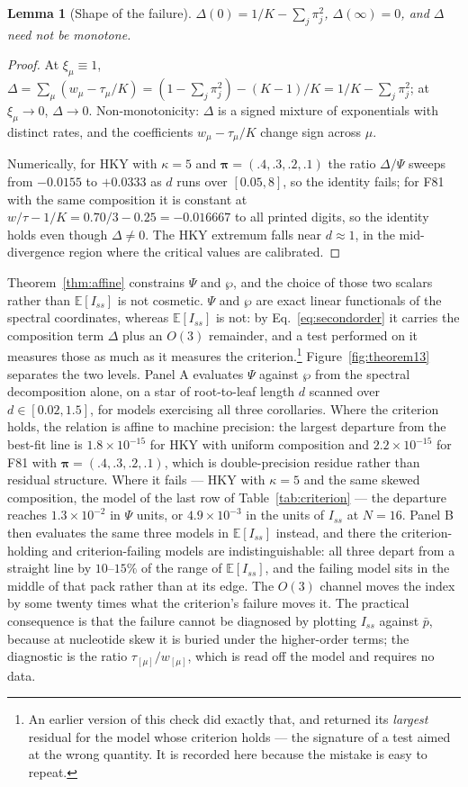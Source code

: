 \documentclass[preprint,12pt,authoryear]{elsarticle}
\newcommand{\Iss}{I_{ss}}
\newcommand{\bpi}{\boldsymbol{\pi}}
\newcommand{\E}{\mathbb{E}}
\newtheorem{lemma}[theorem]{Lemma}
\theoremstyle{definition}
\theoremstyle{remark}
\begin{document}
\begin{lemma}[Shape of the failure]
\label{lem:delta}
$\Delta(0)=1/K-\sum_j\pi_j^2$, $\Delta(\infty)=0$, and $\Delta$ need not be
monotone.
\end{lemma}

\begin{proof}
At $\xi_\mu\equiv1$, $\Delta=\sum_\mu(w_\mu-\tau_\mu/K)=(1-\sum_j\pi_j^2)-(K-1)/K=1/K-\sum_j\pi_j^2$;
at $\xi_\mu\to0$, $\Delta\to0$. Non-monotonicity: $\Delta$ is a signed mixture
of exponentials with distinct rates, and the coefficients
$w_\mu-\tau_\mu/K$ change sign across $\mu$.

Numerically, for HKY with $\kappa=5$ and $\bpi=(.4,.3,.2,.1)$ the ratio
$\Delta/\Psi$ sweeps from $-0.0155$ to $+0.0333$ as $d$ runs over
$[0.05,8]$, so the identity fails; for F81 with the same composition it is
constant at $w/\tau-1/K=0.70/3-0.25=-0.016667$ to all printed digits, so the
identity holds even though $\Delta\ne0$. The HKY extremum falls near
$d\approx1$, in the mid-divergence region where the critical values are
calibrated.
\end{proof}

Theorem~\ref{thm:affine} constrains $\Psi$ and $\wp$, and the choice of those
two scalars rather than $\E[\Iss]$ is not cosmetic. $\Psi$ and $\wp$ are exact
linear functionals of the spectral coordinates, whereas $\E[\Iss]$ is not: by
Eq.~\eqref{eq:secondorder} it carries the composition term $\Delta$ plus an
$O(3)$ remainder, and a test performed on it measures those as much as it
measures the criterion.\footnote{An earlier version of this check did exactly
that, and returned its \emph{largest} residual for the model whose criterion
holds --- the signature of a test aimed at the wrong quantity. It is recorded
here because the mistake is easy to repeat.} Figure~\ref{fig:theorem13}
separates the two levels. Panel A evaluates $\Psi$ against $\wp$ from the
spectral decomposition alone, on a star of root-to-leaf length $d$ scanned
over $d\in[0.02,1.5]$, for models exercising all three corollaries. Where the
criterion holds, the relation is affine to machine precision: the largest
departure from the best-fit line is $1.8\times10^{-15}$ for HKY with uniform
composition and $2.2\times10^{-15}$ for F81 with $\bpi=(.4,.3,.2,.1)$, which
is double-precision residue rather than residual structure. Where it fails ---
HKY with $\kappa=5$ and the same skewed composition, the model of the last row
of Table~\ref{tab:criterion} --- the departure reaches $1.3\times10^{-2}$ in
$\Psi$ units, or $4.9\times10^{-3}$ in the units of $\Iss$ at $N=16$.
Panel B then evaluates the same three models in $\E[\Iss]$ instead, and there
the criterion-holding and criterion-failing models are indistinguishable: all
three depart from a straight line by $10$--$15\%$ of the range of $\E[\Iss]$,
and the failing model sits in the middle of that pack rather than at its edge.
The $O(3)$ channel moves the index by some twenty times what the criterion's
failure moves it. The practical consequence is that the failure cannot be
diagnosed by plotting $\Iss$ against $\bar p$, because at nucleotide skew it
is buried under the higher-order terms; the diagnostic is the ratio
$\tau_{[\mu]}/w_{[\mu]}$, which is read off the model and requires no data.
\end{document}

